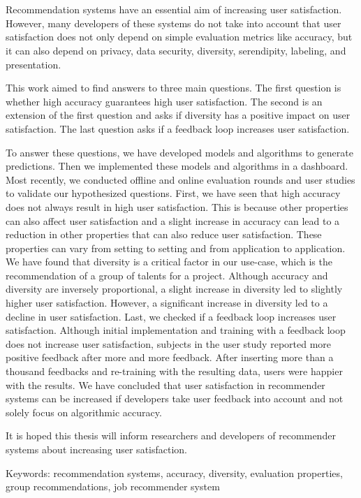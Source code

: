 \chapter{\abstractname}

Recommendation systems have an essential aim of increasing user satisfaction. However, many developers of these systems do not take into account that user satisfaction does not only depend on simple evaluation metrics like accuracy, but it can also depend on privacy, data security, diversity, serendipity, labeling, and presentation.

This work aimed to find answers to three main questions. The first question is whether high accuracy guarantees high user satisfaction. The second is an extension of the first question and asks if diversity has a positive impact on user satisfaction. The last question asks if a feedback loop increases user satisfaction.

To answer these questions, we have developed models and algorithms to generate predictions. Then we implemented these models and algorithms in a dashboard. Most recently, we conducted offline and online evaluation rounds and user studies to validate our hypothesized questions. First, we have seen that high accuracy does not always result in high user satisfaction. This is because other properties can also affect user satisfaction and a slight increase in accuracy can lead to a reduction in other properties that can also reduce user satisfaction. These properties can vary from setting to setting and from application to application. We have found that diversity is a critical factor in our use-case, which is the recommendation of a group of talents for a project. Although accuracy and diversity are inversely proportional, a slight increase in diversity led to slightly higher user satisfaction. However, a significant increase in diversity led to a decline in user satisfaction. Last, we checked if a feedback loop increases user satisfaction. Although initial implementation and training with a feedback loop does not increase user satisfaction, subjects in the user study reported more positive feedback after more and more feedback. After inserting more than a thousand feedbacks and re-training with the resulting data, users were happier with the results. We have concluded that user satisfaction in recommender systems can be increased if developers take user feedback into account and not solely focus on algorithmic accuracy.

It is hoped this thesis will inform researchers and developers of recommender systems about increasing user satisfaction.

Keywords: recommendation systems, accuracy, diversity, evaluation properties, group recommendations, job recommender system


